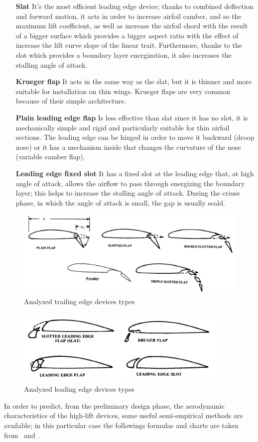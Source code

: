 \begin{itemize}
\item[\textbf{Slat}]  It's the most efficient leading edge device; thanks to combined deflection and forward motion, it acts in order to increase airfoil camber, and so the maximum lift coefficient, as well as increase the airfoil chord with the result of a bigger surface which provides a bigger aspect ratio with the effect of increase the lift curve slope of the linear trait. Furthermore, thanks to the slot which provides a boundary layer energization, it also increases the stalling angle of attack.
\item[\textbf{Krueger flap}]  It acts in the same way as the slat, but it is thinner and more suitable for installation on thin wings. Krueger flaps are very common because of their simple architecture.
\item[\textbf{Plain leading edge flap}] Is less effective than slat since it has no slot, it is mechanically simple and rigid and particularly suitable for thin airfoil sections. The leading edge can be hinged in order to move it backward (droop nose) or it has a mechanism inside that changes the curvature of the nose (variable camber flap).
\item[\textbf{Leading edge fixed slot}] It has a fixed slot at the leading edge that, at high angle of attack, allows the airflow to pass through energizing the boundary layer; this helps to increase the stalling angle of attack. During the criuse phase, in which the angle of attack is small, the gap is usually seald.
\end{itemize}
%
\begin{figure}[!t]
  \centering
  \includegraphics[width=\linewidth]{Flap}
  \caption{Analyzed trailing edge devices types}
  \label{fig:FlapTypes}
\end{figure}
%
\begin{figure}[!t]
  \centering
  \includegraphics[width=0.7\linewidth]{Slat}
  \caption{Analyzed leading edge devices types}
  \label{fig:SlatTypes}
\end{figure}
%
\noindent
In order to predict, from the preliminary design phase, the aerodynamic characteristics of the high-lift devices, some useful semi-empirical methods are available; in this particular case the followings formulas and charts are taken from~\cite{torenbeek1982synthesis} and~\cite{sforza2014commercial}.


